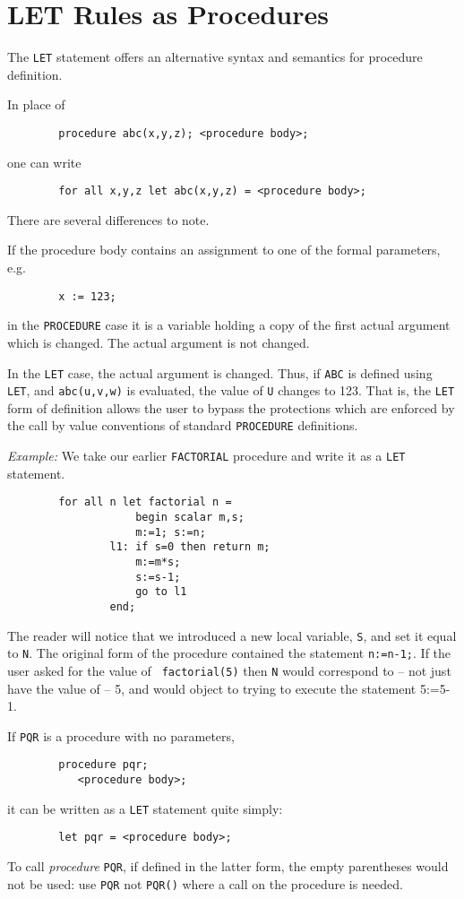 \section{LET Rules as Procedures}

The {\tt LET}  statement offers an alternative syntax and
semantics for procedure definition.

In place of
\begin{verbatim}
        procedure abc(x,y,z); <procedure body>;
\end{verbatim}
one can write
\begin{verbatim}
        for all x,y,z let abc(x,y,z) = <procedure body>;
\end{verbatim}
There are several differences to note.

If the procedure body contains an assignment to one of the formal
parameters, e.g.
\begin{verbatim}
        x := 123;
\end{verbatim}
in the {\tt PROCEDURE} case it is a variable holding a copy of the first
actual argument which is changed.  The actual argument is not changed.

In the {\tt LET} case, the actual argument is changed.  Thus, if {\tt ABC}
is defined using {\tt LET}, and {\tt abc(u,v,w)} is evaluated, the value
of {\tt U} changes to 123.  That is, the {\tt LET} form of definition
allows the user to bypass the protections which are enforced by the call
by value conventions of standard {\tt PROCEDURE} definitions.

{\it Example:}  We take our earlier {\tt FACTORIAL} 
procedure and write it as a {\tt LET} statement.
\begin{verbatim}
        for all n let factorial n =
                    begin scalar m,s;
                    m:=1; s:=n;
                l1: if s=0 then return m;
                    m:=m*s;
                    s:=s-1;
                    go to l1
                end;
\end{verbatim}
The reader will notice that we introduced a new local variable, {\tt S},
and set it equal to {\tt N}.  The original form of the procedure contained
the statement {\tt n:=n-1;}.  If the user asked for the value of {\tt
factorial(5)} then {\tt N} would correspond to -- not just have the value
of -- 5, and {\REDUCE} would object to trying to execute the statement
5:=5-1.

If {\tt PQR} is a procedure with no parameters,
\begin{verbatim}
        procedure pqr;
           <procedure body>;
\end{verbatim}
it can be written as a {\tt LET} statement quite simply:
\begin{verbatim}
        let pqr = <procedure body>;
\end{verbatim}
To call {\em procedure} {\tt PQR}, if defined in the latter form, the empty
parentheses would not be used: use {\tt PQR} not {\tt PQR()} where a call
on the procedure is needed.

